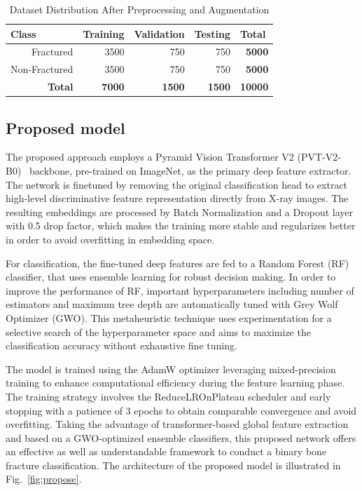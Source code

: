 \documentclass{styles/svproc}
\begin{document}
\begin{table}[!h]
\caption{Dataset Distribution After Preprocessing and Augmentation}
\begin{center}
\begin{tabular}{r@{\quad}rrrr}
\hline
\multicolumn{1}{l}{\rule{0pt}{4pt}\textbf{Class}} & 
\multicolumn{1}{l}{\textbf{Training}} & 
\multicolumn{1}{l}{\textbf{Validation}} & 
\multicolumn{1}{l}{\textbf{Testing}} & 
\multicolumn{1}{l}{\textbf{Total}} \\
\hline\rule{0pt}{4pt}
Fractured & 3500 & 750 & 750 & \textbf{5000} \\
Non-Fractured & 3500 & 750 & 750 & \textbf{5000} \\
\hline\rule{0pt}{4pt}
\textbf{Total} & \textbf{7000} & \textbf{1500} & \textbf{1500} & \textbf{10000} \\
\hline
\end{tabular}
\end{center}
\label{tab:dataset_split}
\end{table}





\subsection{Proposed model}

The proposed approach employs a Pyramid Vision Transformer V2 (PVT-V2-B0)~\cite{pvt} backbone, pre-trained on ImageNet, as the primary deep feature extractor. The network is finetuned by removing the original classification head to extract high-level discriminative feature representation directly from X-ray images. The resulting embeddings are processed by Batch Normalization and a Dropout layer with 0.5 drop factor, which makes the training more stable and regularizes better in order to avoid overfitting in embedding space.

For classification, the fine-tuned deep features are fed to a Random Forest (RF) classifier, that uses ensemble learning for robust decision making.  In order to improve the performance of RF, important hyperparameters including number of estimators and maximum tree depth are automatically tuned with Grey Wolf Optimizer (GWO). This metaheuristic technique uses experimentation for a selective search of the hyperparameter space and aims to maximize the classification accuracy without exhaustive fine tuning.

The model is trained using the AdamW optimizer leveraging mixed-precision training to enhance computational efficiency during the feature learning phase. The training strategy involves the ReduceLROnPlateau scheduler and early stopping with a patience of 3 epochs to obtain comparable convergence and avoid overfitting.  Taking the advantage of transformer-based global feature extraction and based on a GWO-optimized ensemble classifiers, this proposed network offers an effective as well as understandable framework to conduct a binary bone fracture classification.  The architecture of the proposed model is illustrated in Fig.~\ref{fig:propose}.
\end{document}
